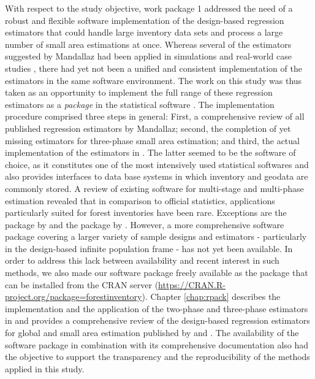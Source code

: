 With respect to the study objective, work package 1 addressed the need of a robust and flexible software implementation of the design-based regression estimators that could handle large inventory data sets and process a large number of small area estimations at once. Whereas several of the estimators suggested by Mandallaz had been applied in simulations and real-world case studies \citep{mandallaz2013a, mandallaz2013b, mandallaz2013c, massey2014a, massey2015a, massey2015b}, there had yet not been a unified and consistent implementation of the estimators in the same software environment. The work on this study was thus taken as an opportunity to implement the full range of these regression estimators as a \textit{package} in the statistical software  \citep{R}. The implementation procedure comprised three steps in general: First, a comprehensive review of all published regression estimators by Mandallaz; second, the completion of yet missing estimators for three-phase small area estimation; and third, the actual implementation of the estimators in . The latter seemed to be the software of choice, as it constitutes one of the most intensively used statistical softwares and also provides interfaces to data base systems in which inventory and geodata are commonly stored. A review of existing software for multi-stage and multi-phase estimation revealed that in comparison to official statistics, applications particularly suited for forest inventories have been rare. Exceptions are the  package  by \citet{josae2015} and the  package by \citet{cullmann2016}. However, a more comprehensive software package covering a larger variety of sample designs and estimators - particularly in the design-based infinite population frame - has not yet been available. In order to address this lack between availability and recent interest in such methods, we also made our software package freely available as the  package  that can be installed from the CRAN server (\url{https://CRAN.R-project.org/package=forestinventory}). Chapter \ref{chap:rpack} describes the implementation and the application of the two-phase and three-phase estimators in  and provides a comprehensive review of the design-based regression estimators for global and small area estimation published by \citet{mandallaz2008, mandallaz2013a, mandallaz2013c} and \citet{mandallaz2013b}. The availability of the software package in combination with its comprehensive documentation also had the objective to support the transparency and the reproducibility of the methods applied in this study.


